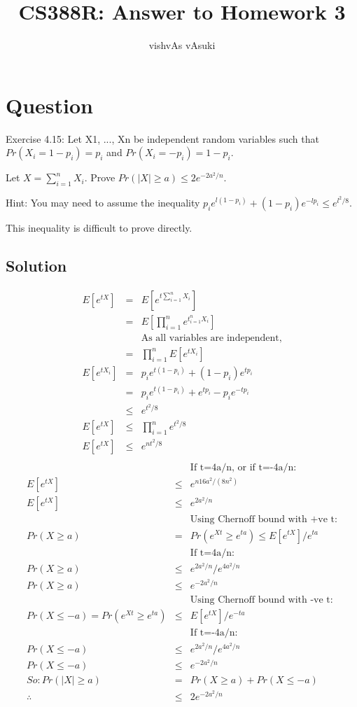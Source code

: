 \documentclass[10pt]{article}
\title{CS388R: Answer to Homework 3}
\author{vishvAs vAsuki}
\begin{document}
\maketitle

\section{Question}
Exercise 4.15: Let X1, ..., Xn be independent random variables such that
$Pr(X_{i}=1-p_{i})=p_{i}$ and $Pr(X_{i}=-p_{i})=1-p_{i}$.

Let $X=\sum_{i=1}^{n}X_{i}$. Prove $Pr(|X|\geq a) \leq 2e^{-2a^{2}/n}$.

Hint: You may need to assume the inequality
$p_{i}e^{l(1-p_{i})}+(1-p_{i})e^{-lp_{i}} \leq e^{l^{2}/8}$.

This inequality is difficult to prove directly.

\subsection{Solution}

\begin{eqnarray}
E[e^{tX}] &=& E[e^{t\sum_{i=1}^{n}X_{i}}]\\
 &=& E[\prod_{i=1}^{n} e^{t_{i=1}^{n}X_{i}}]\\
&& \text{As all variables are independent,}\\
 &=& \prod_{i=1}^{n} E[e^{tX_{i}}]\\
E[e^{tX_{i}}] &=& p_{i}e^{t(1-p_{i})} + (1-p_{i})e^{tp_{i}}\\
 &=& p_{i}e^{t(1-p_{i})} + e^{tp_{i}} -p_{i}e^{-tp_{i}}\\
 &\leq& e^{t^{2}/8}\\
E[e^{tX}] &\leq& \prod_{i=1}^{n} e^{t^{2}/8}\\
E[e^{tX}] &\leq& e^{nt^{2}/8}\\
\end{eqnarray}
\begin{eqnarray}
&& \text{If t=4a/n, or if t=-4a/n:}\\
E[e^{tX}] &\leq& e^{n16a^{2}/(8n^{2})}\\
E[e^{tX}] &\leq& e^{2a^{2}/n}\\
&& \text{Using Chernoff bound with +ve t:}\\
Pr(X \geq a) &=& Pr(e^{Xt} \geq e^{ta}) \leq E[e^{tX}]/e^{ta}\\
&& \text{If t=4a/n:}\\
Pr(X \geq a) &\leq& e^{2a^{2}/n}/e^{4a^{2}/n}\\
Pr(X \geq a) &\leq& e^{-2a^{2}/n}\\
&& \text{Using Chernoff bound with -ve t:}\\
Pr(X \leq -a) = Pr(e^{Xt} \geq e^{ta}) &\leq& E[e^{tX}]/e^{-ta}\\
&& \text{If t=-4a/n:}\\
Pr(X \leq -a) &\leq& e^{2a^{2}/n}/e^{4a^{2}/n}\\
Pr(X \leq -a) &\leq& e^{-2a^{2}/n}\\
So: Pr(|X| \geq a) &=& Pr(X \geq a)+Pr(X \leq -a)\\
\therefore &\leq& 2e^{-2a^{2}/n}\\
\end{eqnarray}
\end{document}
